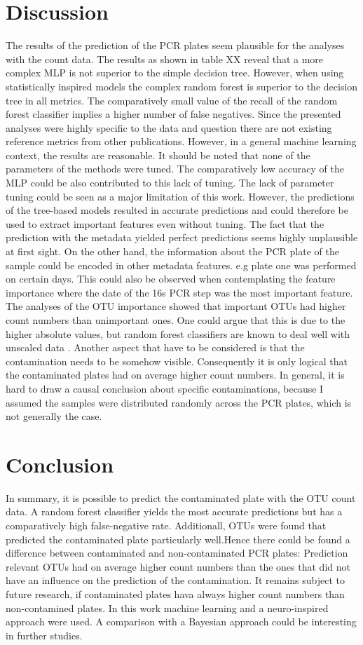 \documentclass{svproc}
\begin{document}
\section{Discussion}
The results of the prediction of the PCR plates seem plausible for the analyses with the count data. The results as shown in table XX reveal that a more complex MLP is not superior to the simple decision tree. However, when using statistically inspired models the complex random forest is superior to the decision tree in all metrics. The comparatively small value of the recall of the random forest classifier implies a higher number of false negatives. Since the presented analyses were highly specific to the data and question there are not existing reference metrics from other publications. However, in a general machine learning context, the results are reasonable. It should be noted that none of the parameters of the methods were tuned. The comparatively low accuracy of the MLP could be also contributed to this lack of tuning. The lack of parameter tuning could be seen as a major limitation of this work. However, the predictions of the tree-based models resulted in accurate predictions and could therefore be used to extract important features even without tuning.
The fact that the prediction with the metadata yielded perfect predictions seems highly unplausible at first sight. On the other hand, the information about the PCR plate of the sample could be encoded in other metadata features. e.g plate one was performed on certain days. This could also be observed when contemplating the feature importance where the date of the 16s PCR step was the most important feature.
The analyses of the OTU importance showed that important OTUs had higher count numbers than unimportant ones. One could argue that this is due to the higher absolute values, but random forest classifiers are known to deal well with unscaled data \cite{breiman2001random}. Another aspect that have to be considered is that the contamination needs to be somehow visible. Consequently it is only logical that the contaminated plates had on average higher count numbers.
 In general, it is hard to draw a causal conclusion about specific contaminations, because I assumed the samples were distributed randomly across the PCR plates, which is not generally the case.
\section{Conclusion}
%
In summary, it is possible to predict the contaminated plate with the OTU count data. A random forest classifier yields the most accurate predictions but has a comparatively high false-negative rate. Additionall, OTUs were found that predicted the contaminated plate particularly well.Hence there could be found a difference between contaminated and non-contaminated PCR plates: Prediction relevant OTUs had on average higher count numbers than the ones that did not have an influence on the prediction of the contamination. It remains subject to future research, if contaminated plates hava always higher count numbers than non-contamined plates. In this work machine learning and a neuro-inspired approach were used. A comparison with a Bayesian approach could be interesting in further studies.

%
%
%


\end{document}

